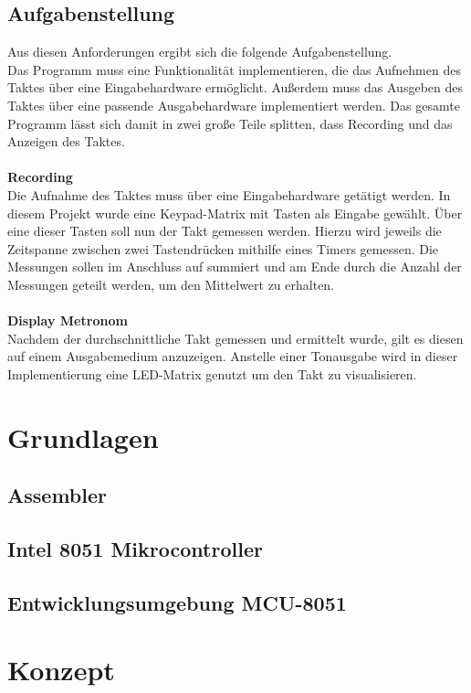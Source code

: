 \documentclass[a4paper, 12pt]{scrartcl}
\begin{document}
\subsection{Aufgabenstellung}
Aus diesen Anforderungen ergibt sich die folgende Aufgabenstellung.
\\
Das Programm muss eine Funktionalität implementieren, die das Aufnehmen des Taktes über eine Eingabehardware ermöglicht. Außerdem muss das Ausgeben des Taktes über eine passende Ausgabehardware implementiert werden.
Das gesamte Programm lässt sich damit in zwei große Teile splitten, dass Recording und das Anzeigen des Taktes.
\\
\\
\textbf{Recording}
\\
Die Aufnahme des Taktes muss über eine Eingabehardware getätigt werden. In diesem Projekt wurde eine Keypad-Matrix mit Tasten als Eingabe gewählt. Über eine dieser Tasten soll nun der Takt gemessen werden. Hierzu wird jeweils die Zeitspanne zwischen zwei Tastendrücken mithilfe eines Timers gemessen. Die Messungen sollen im Anschluss auf summiert und am Ende durch die Anzahl der Messungen geteilt werden, um den Mittelwert zu erhalten.
\\
\\
\textbf{Display Metronom}
\\
Nachdem der durchschnittliche Takt gemessen und ermittelt wurde, gilt es diesen auf einem Ausgabemedium anzuzeigen. Anstelle einer Tonausgabe wird in dieser Implementierung eine LED-Matrix genutzt um den Takt zu visualisieren.
\newpage
\section{Grundlagen}
\subsection{Assembler}
\subsection{Intel 8051 Mikrocontroller}
\subsection{Entwicklungsumgebung MCU-8051}

\newpage
\section{Konzept}
\end{document}
